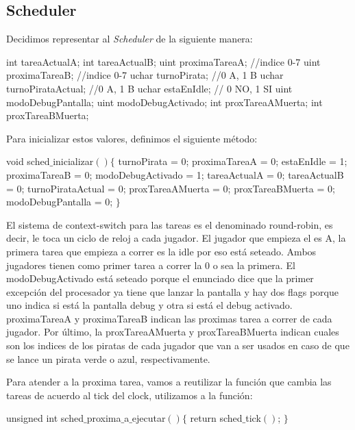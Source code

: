 \subsection{Scheduler}

Decidimos representar al \textit{Scheduler} de la siguiente manera:
\begin{algorithmic}
\State \tab int tareaActualA;
\State \tab int tareaActualB;
\State \tab uint proximaTareaA; //indice 0-7
\State \tab uint proximaTareaB; //indice 0-7
\State \tab uchar turnoPirata; //0 A, 1 B
\State \tab uchar turnoPirataActual; //0 A, 1 B
\State \tab uchar estaEnIdle; // 0 NO, 1 SI
\State \tab uint modoDebugPantalla;
\State \tab uint modoDebugActivado;
\State \tab int proxTareaAMuerta;
\State \tab int proxTareaBMuerta;
\end{algorithmic}

Para inicializar estos valores, definimos el siguiente m\'etodo:
\begin{algorithmic}
    \State \tab void sched$\_$inicializar$() \{$
    \State \tab \tab turnoPirata = 0;
    \State \tab \tab proximaTareaA = 0;
    \State \tab \tab estaEnIdle = 1;
    \State \tab \tab proximaTareaB = 0;
    \State \tab \tab modoDebugActivado = 1;
    \State \tab \tab tareaActualA = 0;
    \State \tab \tab tareaActualB = 0;
    \State \tab \tab turnoPirataActual = 0;
    \State \tab \tab proxTareaAMuerta = 0;
    \State \tab \tab proxTareaBMuerta = 0;
    \State \tab \tab modoDebugPantalla = 0; 
    \State \tab $\}$
\end{algorithmic}

El sistema de context-switch para las tareas es el denominado round-robin, es decir, le toca un ciclo de reloj a cada jugador.
El jugador que empieza el es A, la primera tarea que empieza a correr es la idle por eso está seteado. Ambos jugadores tienen como primer tarea a correr la 0 o sea la primera. El modoDebugActivado está seteado porque el enunciado dice que la primer excepción del procesador ya tiene que lanzar la pantalla y hay dos flags porque uno indica si está la pantalla debug y otra si está el debug activado.
proximaTareaA y proximaTareaB indican las proximas tarea a correr de cada jugador. Por último, la proxTareaAMuerta y proxTareaBMuerta indican cuales son los indices de los piratas de cada jugador que van a ser usados en caso de que se lance un pirata verde o azul, respectivamente.

Para atender a la proxima tarea, vamos a reutilizar la funci\'on que cambia las tareas de acuerdo al tick del clock, utilizamos a la funci\'on:
\begin{algorithmic}
    \State \tab unsigned int sched$\_$proxima$\_$a$\_$ejecutar$() \{$
    \State \tab \tab return sched$\_$tick$()$;
    \State \tab $\}$
\end{algorithmic}

